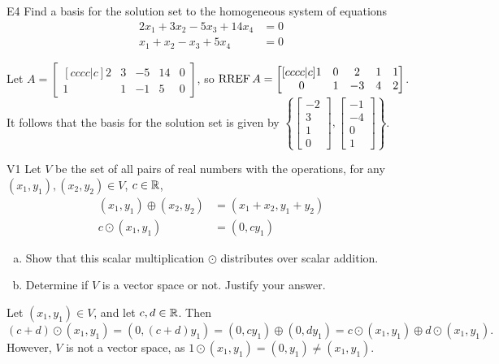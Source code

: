 \documentclass{sbgLAquiz}
\begin{document}
\begin{extract}\newpage\end{extract}
\begin{problem}{E4}
Find a basis for the solution set to the homogeneous system of equations
\begin{align*}
2x_1+3x_2-5x_3+14x_4 &= 0\\
x_1+x_2-x_3+5x_4 &= 0
\end{align*}
\end{problem}
\begin{solution}
Let \(A =
  \begin{bmatrix}[cccc|c]
    2 & 3 & -5 & 14 & 0 \\
    1 & 1 & -1 & 5 & 0
  \end{bmatrix}
\), so \(\operatorname{RREF} A =
  \begin{bmatrix}[cccc|c]
    1 & 0 & 2 & 1 & 1 \\
    0 & 1 & -3 & 4 & 2 \\
  \end{bmatrix}
\).
It follows that the basis for the solution set is given by \(\left\{
  \begin{bmatrix}
    - 2 \\
    3 \\
    1 \\
    0
  \end{bmatrix},
  \begin{bmatrix}
    -1 \\
    - 4 \\
    0 \\
    1
  \end{bmatrix}
\right\}\).
\end{solution}

\begin{problem}{V1}
Let $V$ be the set of all pairs of real numbers with the operations, for any $(x_1,y_1), (x_2,y_2) \in V$, $c \in \mathbb{R}$,
\begin{align*}
(x_1,y_1) \oplus (x_2,y_2) &= (x_1+x_2,y_1+y_2) \\
c \odot (x_1,y_1) &= (0, cy_1)
\end{align*}
\begin{enumerate}[(a)]
\item Show that this scalar multiplication $\odot$ distributes over scalar addition.
\item Determine if $V$ is a vector space or not.  Justify your answer.
\end{enumerate}
\end{problem}
\begin{solution}
Let $(x_1,y_1) \in V$, and let $c,d \in \mathbb{R}$.  Then
$$(c+d)\odot (x_1,y_1)=(0, (c+d)y_1) = (0,cy_1) \oplus (0,dy_1) = c \odot (x_1,y_1) \oplus d \odot (x_1,y_1).$$
However, $V$ is not a vector space, as $1 \odot (x_1,y_1) = (0,y_1) \neq (x_1,y_1)$.
\end{solution}
\end{document}
